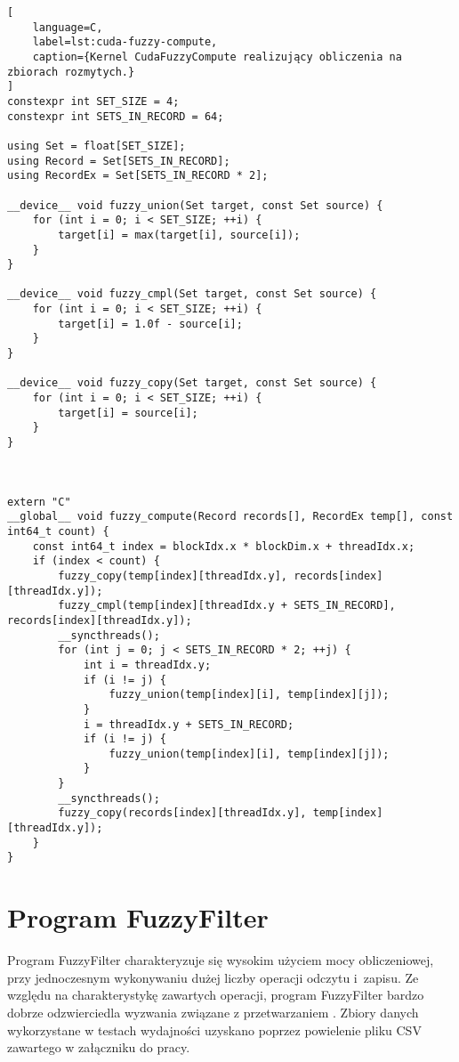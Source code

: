 \begin{lstlisting}[
    language=C,
    label=lst:cuda-fuzzy-compute,
    caption={Kernel CudaFuzzyCompute realizujący obliczenia na zbiorach rozmytych.}
]
constexpr int SET_SIZE = 4;
constexpr int SETS_IN_RECORD = 64;

using Set = float[SET_SIZE];
using Record = Set[SETS_IN_RECORD];
using RecordEx = Set[SETS_IN_RECORD * 2];

__device__ void fuzzy_union(Set target, const Set source) {
    for (int i = 0; i < SET_SIZE; ++i) {
        target[i] = max(target[i], source[i]);
    }
}

__device__ void fuzzy_cmpl(Set target, const Set source) {
    for (int i = 0; i < SET_SIZE; ++i) {
        target[i] = 1.0f - source[i];
    }
}

__device__ void fuzzy_copy(Set target, const Set source) {
    for (int i = 0; i < SET_SIZE; ++i) {
        target[i] = source[i];
    }
}



extern "C"
__global__ void fuzzy_compute(Record records[], RecordEx temp[], const int64_t count) {
    const int64_t index = blockIdx.x * blockDim.x + threadIdx.x;
    if (index < count) {
        fuzzy_copy(temp[index][threadIdx.y], records[index][threadIdx.y]);
        fuzzy_cmpl(temp[index][threadIdx.y + SETS_IN_RECORD], records[index][threadIdx.y]);
        __syncthreads();
        for (int j = 0; j < SETS_IN_RECORD * 2; ++j) {
            int i = threadIdx.y;
            if (i != j) {
                fuzzy_union(temp[index][i], temp[index][j]);
            }
            i = threadIdx.y + SETS_IN_RECORD;
            if (i != j) {
                fuzzy_union(temp[index][i], temp[index][j]);
            }
        }
        __syncthreads();
        fuzzy_copy(records[index][threadIdx.y], temp[index][threadIdx.y]);
    }
}
\end{lstlisting}

\section{Program FuzzyFilter}

Program FuzzyFilter charakteryzuje się wysokim użyciem mocy obliczeniowej, przy jednoczesnym
wykonywaniu dużej liczby operacji odczytu i~zapisu. Ze względu na charakterystykę zawartych operacji,
program FuzzyFilter bardzo dobrze odzwierciedla wyzwania związane z przetwarzaniem .
Zbiory danych wykorzystane w testach wydajności uzyskano poprzez powielenie pliku CSV zawartego
w załączniku do pracy.


